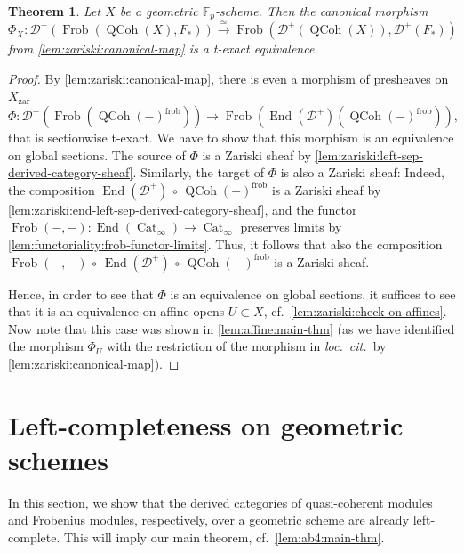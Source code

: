 \documentclass{article}
\theoremstyle{definition}
\theoremstyle{definition}
\theoremstyle{definition}
\theoremstyle{plain}
\theoremstyle{plain}
\theoremstyle{plain}
\theoremstyle{plain}
\newtheorem{thm}[defn]{Theorem}
\theoremstyle{plain}
\theoremstyle{plain}
\theoremstyle{plain}
\theoremstyle{plain}
\theoremstyle{remark}
\theoremstyle{remark}
\theoremstyle{plain}
\theoremstyle{plain}
\theoremstyle{plain}
\theoremstyle{plain}
\theoremstyle{plain}
\newcommand{\Fp}{\mathbb{F}_p}
\newcommand{\QCoh}[1]{\operatorname{QCoh}(#1)}
\newcommand{\Frob}[2]{\operatorname{Frob}(#1, #2)}
\newcommand{\FrobSingle}[1]{\operatorname{Frob}(#1)}
\newcommand{\End}[1]{\operatorname{End}(#1)}
\newcommand{\Cat}[1]{\mathcal{#1}}
\newcommand{\CatInf}{\operatorname{Cat}_{\infty}}
\newcommand{\zar}{\operatorname{zar}}
\newcommand{\frob}{\operatorname{frob}}
\newcommand{\loccit}{\textit{loc.~cit.~}}
\begin{document}
\begin{thm} \label{lem:zariski:main-thm}
    Let $X$ be a geometric $\Fp$-scheme.
    Then the canonical morphism 
    \begin{equation*}
        \Phi_X \colon \Cat{D}^+ (\Frob{\QCoh{X}}{F_*}) \xrightarrow{\simeq} \Frob{\Cat{D}^+(\QCoh{X})}{\Cat{D}^+(F_*)}
    \end{equation*}
    from \cref{lem:zariski:canonical-map} is a t-exact equivalence.
\end{thm}
\begin{proof}
    By \cref{lem:zariski:canonical-map},
    there is even a morphism of presheaves on $X_{\zar}$
    \begin{equation*}
        \Phi \colon \Cat{D}^+ (\FrobSingle{\QCoh{-}^{\frob}}) \to \FrobSingle{\End{\Cat D^+}(\QCoh{-}^{\frob})},
    \end{equation*}
    that is sectionwise t-exact. We have to show that this morphism is an equivalence on global sections.
    The source of $\Phi$ is a Zariski sheaf by \cref{lem:zariski:left-sep-derived-category-sheaf}.
    Similarly, the target of $\Phi$ is also a Zariski sheaf: 
    Indeed, the composition $\End{\Cat D^+} \, \circ \, \QCoh{-}^{\frob}$ is a Zariski sheaf by \cref{lem:zariski:end-left-sep-derived-category-sheaf}, 
    and the functor $\Frob{-}{-} \colon \End{\CatInf} \to \CatInf$ preserves limits by \cref{lem:functoriality:frob-functor-limits}.
    Thus, it follows that also the composition $\Frob{-}{-} \, \circ \, \End{\Cat D^+} \, \circ \, \QCoh{-}^{\frob}$ is a Zariski sheaf. 
    
    Hence, in order to see that $\Phi$ is an equivalence on global sections,
    it suffices to see that it is an equivalence on affine opens $U \subset X$, cf.\ \cref{lem:zariski:check-on-affines}.
    Now note that this case was shown in \cref{lem:affine:main-thm} (as we have identified the morphism $\Phi_U$ with the restriction of the morphism 
    in \loccit by \cref{lem:zariski:canonical-map}).
\end{proof}

\section{Left-completeness on geometric schemes}
In this section, we show that the derived categories of quasi-coherent modules and Frobenius modules, respectively,  
over a geometric scheme are already left-complete. This will imply our main theorem, cf.\ \cref{lem:ab4:main-thm}.
\end{document}
